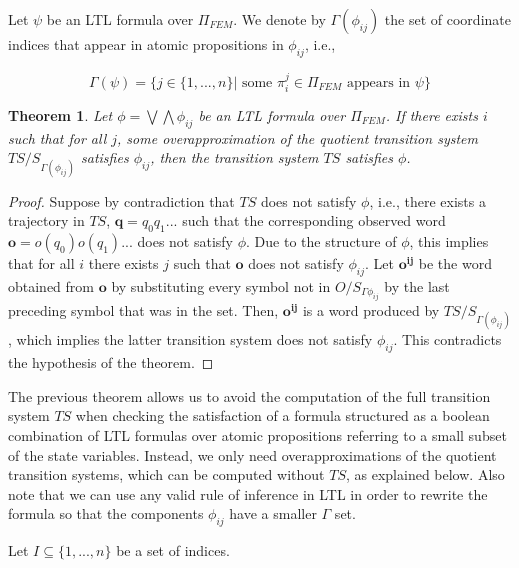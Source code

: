 \documentclass{article}
\newtheorem{theorem}{Theorem}
\begin{document}
Let $\psi$ be an LTL formula over $\Pi_{FEM}$. We
denote by $\Gamma(\phi_{ij})$ the set of coordinate indices that appear in
atomic propositions in $\phi_{ij}$, i.e.,

\begin{equation}
    \Gamma(\psi) = \{j \in \{1,...,n\}| \text{ some }\pi_i^j \in \Pi_{FEM} \text{ appears in } \psi\}
\end{equation}


\begin{theorem}

Let $\phi = \bigvee \bigwedge \phi_{ij}$ be an LTL formula over $\Pi_{FEM}$. If
there exists $i$ such that for all $j$, some overapproximation of the quotient transition system
$TS/S_{\Gamma(\phi_{ij})}$ satisfies $\phi_{ij}$, then the transition system $TS$
satisfies $\phi$.
    
\end{theorem}

\begin{proof}

Suppose by contradiction that $TS$ does not satisfy $\phi$, i.e., there exists a
trajectory in $TS$, $\mathbf{q} = q_0 q_1...$ such that the corresponding observed
word $\mathbf{o} = o(q_0) o(q_1)...$ does not satisfy $\phi$. Due to the structure
of $\phi$, this implies that for all $i$ there exists $j$ such that $\mathbf{o}$ does
not satisfy $\phi_{ij}$. Let $\mathbf{o^{ij}}$ be the word obtained from
$\mathbf{o}$ by substituting every symbol not in $O/S_{\Gamma{\phi_{ij}}}$ by
the last preceding symbol that was in the set. Then, $\mathbf{o^{ij}}$ is a word
produced by $TS/S_{\Gamma(\phi_{ij})}$, which implies the latter transition system
does not satisfy $\phi_{ij}$. This contradicts the hypothesis of the
theorem.
    
\end{proof}

The previous theorem allows us to avoid the computation of the full transition
system $TS$ when checking the satisfaction of a formula structured as a boolean
combination of LTL formulas over atomic propositions referring to a small subset
of the state variables. Instead, we only need overapproximations of the quotient
transition systems, which can be computed without $TS$, as explained below. Also
note that we can use any valid rule of inference in LTL in order to rewrite the
formula so that the components $\phi_{ij}$ have a smaller $\Gamma$ set.

Let $I \subseteq \{1,...,n\}$ be a set of indices. 
\end{document}
